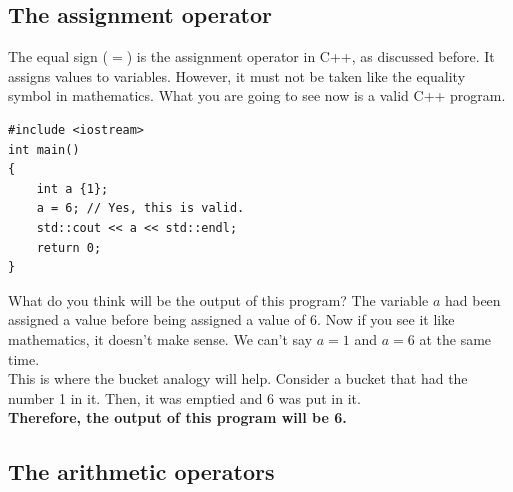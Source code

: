 \documentclass[letterpaper, 12pt]{book}
\begin{document}
\subsection{The assignment operator}
The equal sign ($=$) is the assignment operator in C++, as discussed before. It assigns values to variables. However, it must not be taken like the equality symbol in mathematics. What you are going to see now is a valid C++ program.
\begin{lstlisting}
#include <iostream>
int main()
{
	int a {1};
	a = 6; // Yes, this is valid.
	std::cout << a << std::endl;
	return 0;
}
\end{lstlisting}
What do you think will be the output of this program? The variable $a$ had been assigned a value before being assigned a value of 6. Now if you see it like mathematics, it doesn't make sense. We can't say $a = 1$ and $a = 6$ at the same time.\\
This is where the bucket analogy will help. Consider a bucket that had the number 1 in it. Then, it was emptied and 6 was put in it.\\
\textbf{Therefore, the output of this program will be 6.}
\subsection{The arithmetic operators}
\end{document}
